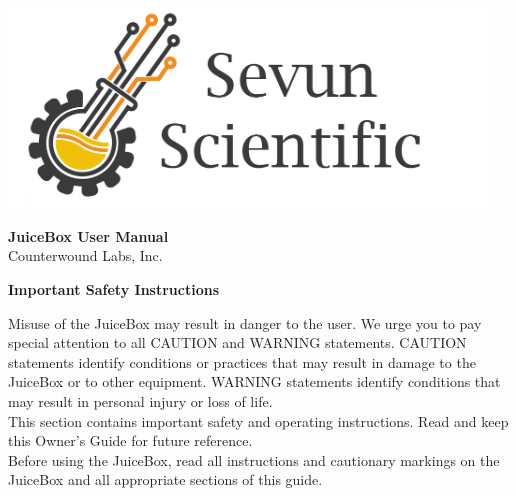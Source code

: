 \documentclass[10pt]{article}
\begin{document}
\date{\today} %
\begin{titlingpage} %
	\centering %
	\includegraphics[width=5in]{ssi_logo.png}
	\vspace{2cm}
\begin{flushleft} %
	\begin{Huge}
		\textbf{JuiceBox User Manual}\\ 
		\vspace{5mm}
		Counterwound Labs, Inc.
	\end{Huge}
\end{flushleft}
\vfill
{\Large \thedate \par} %
\end{titlingpage} 

\begin{flushleft}
	{\huge \textbf{Important Safety Instructions} \par}
	\vspace{1cm}

	\leftskip=3cm %
	\begin{large} 		
		Misuse of the JuiceBox may result in danger to the user. We urge you to
		pay special attention to all CAUTION and WARNING statements.
		CAUTION statements identify conditions or practices that may result in
		damage to the JuiceBox or to other equipment. WARNING statements
		identify conditions that may result in personal injury or loss of life.\\
		\vspace{3mm}
		This section contains important safety and operating instructions. Read
		and keep this Owner’s Guide for future reference.\\
		\vspace{3mm}
		Before using the JuiceBox, read all instructions and
		cautionary markings on the JuiceBox and all appropriate sections of
		this guide.
	\end{large}
\end{flushleft}
\end{document}
